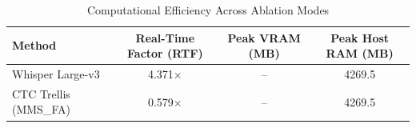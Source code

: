 \begin{table}[t]
\centering
\caption{Computational Efficiency Across Ablation Modes}
\label{tab:computational_performance}
\begin{tabular}{lccc}
\toprule
Method & Real-Time Factor (RTF) & Peak VRAM (MB) & Peak Host RAM (MB) \\
\midrule
Whisper Large-v3 & 4.371\(\times\) & -- & 4269.5 \\
CTC Trellis (MMS\_FA) & 0.579\(\times\) & -- & 4269.5 \\
\bottomrule
\end{tabular}
\end{table}
